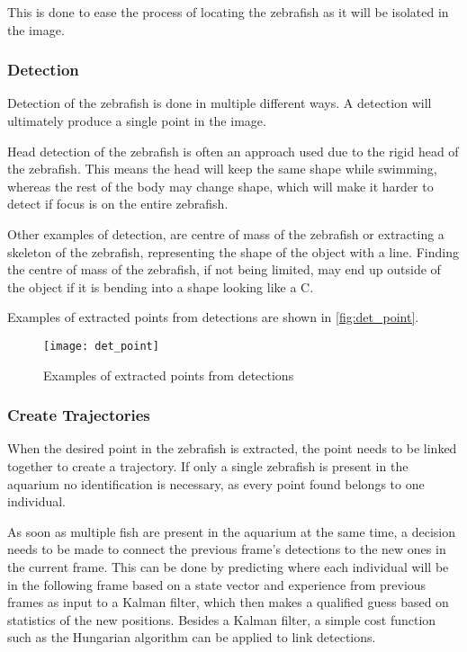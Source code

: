 This is done to ease the process of locating the zebrafish as it will be isolated in the image.

\subsubsection{Detection}
Detection of the zebrafish is done in multiple different ways. A detection will ultimately produce a single point in the image.

Head detection of the zebrafish is often an approach used due to the rigid head of the zebrafish. This means the head will keep the same shape while swimming, whereas the rest of the body may change shape, which will make it harder to detect if focus is on the entire zebrafish.

Other examples of detection, are centre of mass of the zebrafish or extracting a skeleton of the zebrafish, representing the shape of the object with a line. Finding the centre of mass of the zebrafish, if not being limited, may end up outside of the object if it is bending into a shape looking like a C.

Examples of extracted points from detections are shown in \autoref{fig:det_point}.

\begin{figure}[H]
	\centering
	\texttt{[image: det\_point]}
	\caption{Examples of extracted points from detections}
	\label{fig:det_point}
\end{figure}

\subsubsection{Create Trajectories}
When the desired point in the zebrafish is extracted, the point needs to be linked together to create a trajectory. If only a single zebrafish is present in the aquarium no identification is necessary, as every point found belongs to one individual.

As soon as multiple fish are present in the aquarium at the same time, a decision needs to be made to connect the previous frame's detections to the new ones in the current frame. This can be done by predicting where each individual will be in the following frame based on a state vector and experience from previous frames as input to a Kalman filter, which then makes a qualified guess based on statistics of the new positions. Besides a Kalman filter, a simple cost function such as the Hungarian algorithm can be applied to link detections.\\

